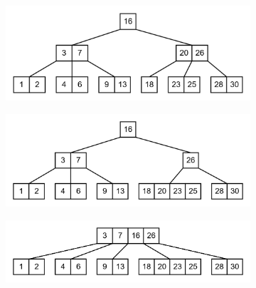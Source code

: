 \documentclass[11pt,a4paper]{article}
\begin{document}
\begin{loesung}
\begin{enumerate}
\begin{figure}[h!]
\begin{subfigure}[b]{0.45\textwidth}
            \end{subfigure}
            \begin{subfigure}[b]{0.45\textwidth}
                \centering
                \includegraphics[width=\textwidth]{img/3c/11}
            \end{subfigure}
            \begin{subfigure}[b]{0.45\textwidth}
                \centering
                \includegraphics[width=\textwidth]{img/3c/12}
            \end{subfigure}
            \begin{subfigure}[b]{0.45\textwidth}
                \centering
                \includegraphics[width=\textwidth]{img/3c/13}
            \end{subfigure}
        \end{figure}
        \FloatBarrier


\end{enumerate}
\end{loesung}
\end{document}
